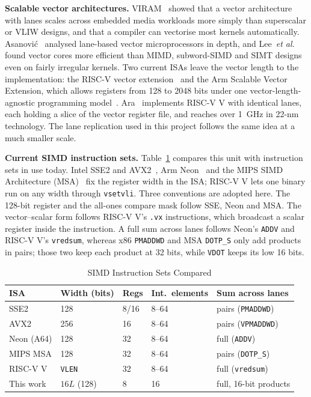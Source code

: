 \documentclass[journal]{IEEEtran}
\begin{document}
\textbf{Scalable vector architectures.} VIRAM~\cite{viram} showed that a vector
architecture with lanes scales across embedded media workloads more simply than
superscalar or VLIW designs, and that a compiler can vectorise most kernels
automatically. Asanovi\'c~\cite{asanovic98} analysed lane-based vector microprocessors
in depth, and Lee~\emph{et al.}~\cite{maven} found vector cores more efficient than
MIMD, subword-SIMD and SIMT designs even on fairly irregular kernels. Two current ISAs
leave the vector length to the implementation: the RISC-V vector extension~\cite{rvv}
and the Arm Scalable Vector Extension, which allows registers from 128 to 2048 bits
under one vector-length-agnostic programming model~\cite{sve}. Ara~\cite{ara}
implements RISC-V V with identical lanes, each holding a slice of the vector register
file, and reaches over 1~GHz in 22-nm technology. The lane replication used in this
project follows the same idea at a much smaller scale.

\textbf{Current SIMD instruction sets.} Table~\ref{tab:isas} compares this unit with
instruction sets in use today. Intel SSE2 and AVX2~\cite{intelsdm}, Arm
Neon~\cite{armarm} and the MIPS SIMD Architecture (MSA)~\cite{msa} fix the register
width in the ISA; RISC-V V lets one binary run on any width through \texttt{vsetvli}.
Three conventions are adopted here. The 128-bit register and the all-ones compare mask
follow SSE, Neon and MSA. The vector--scalar form follows RISC-V V's \texttt{.vx}
instructions, which broadcast a scalar register inside the instruction. A full sum
across lanes follows Neon's \texttt{ADDV} and RISC-V V's \texttt{vredsum}, whereas x86
\texttt{PMADDWD} and MSA \texttt{DOTP\_S} only add products in pairs; those two keep
each product at 32 bits, while \texttt{VDOT} keeps its low 16 bits.

\begin{table}[t]
\centering
\caption{SIMD Instruction Sets Compared}
\label{tab:isas}
\footnotesize
\setlength{\tabcolsep}{4pt}
\begin{tabular}{lllll}
\toprule
ISA & Width (bits) & Regs & Int.\ elements & Sum across lanes \\
\midrule
SSE2       & 128           & 8/16 & 8--64 & pairs (\texttt{PMADDWD}) \\
AVX2       & 256           & 16   & 8--64 & pairs (\texttt{VPMADDWD}) \\
Neon (A64) & 128           & 32   & 8--64 & full (\texttt{ADDV}) \\
MIPS MSA   & 128           & 32   & 8--64 & pairs (\texttt{DOTP\_S}) \\
RISC-V V   & \texttt{VLEN} & 32   & 8--64 & full (\texttt{vredsum}) \\
This work  & $16L$ (128)   & 8    & 16    & full, 16-bit products \\
\bottomrule
\end{tabular}
\end{table}
\end{document}
